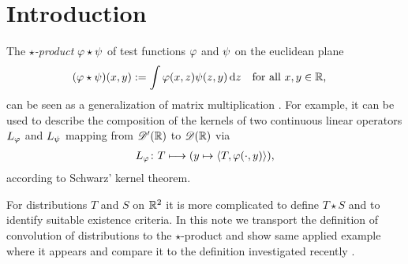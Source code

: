\section{Introduction}
\label{int}

The {\em $\star$-product} $ \varphi \star \psi $
of test functions $ \varphi $ and $ \psi $ on the euclidean plane
\begin{align}
    ( \varphi \star \psi )(x,y)
    &:=
    \int \varphi(x,z)\psi(z,y) \,\mathrm{ d }{ z }
    &&\text{for all $ x,y \in \mathbb{ R } $,}
\end{align}
can be seen as a generalization of matrix multiplication \cite{RBG025}.
For example, it can be used to describe the composition of the kernels
of two continuous linear operators $ L_\varphi $ and $ L_\psi $
mapping from $ \mathscr{  D  }'( \mathbb{ R } ) $ to $ \mathscr{  D  }( \mathbb{ R } ) $ via
\begin{align}
    L_\varphi \colon T \longmapsto ( y \mapsto \langle T , \varphi(\cdot,y) \rangle ),
\end{align}
according to Schwarz' kernel theorem.

For distributions $ T $ and $ S $ on $ \mathbb{ R }^2 $
it is more complicated to define $ T \star S $
and to identify suitable existence criteria.
In this note we transport the definition
of convolution of distributions to the $\star$-product
and show same applied example where it appears
and compare it to the definition investigated recently \cite{RBG025}.
